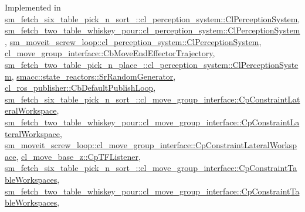 Implemented in \hyperlink{classsm__fetch__six__table__pick__n__sort__1_1_1cl__perception__system_1_1ClPerceptionSystem_a87292907b7b771d19d91c6de47ea8d1d}{sm\+\_\+fetch\+\_\+six\+\_\+table\+\_\+pick\+\_\+n\+\_\+sort\+\_\+::cl\+\_\+perception\+\_\+system\+::\+Cl\+Perception\+System}, \hyperlink{classsm__fetch__two__table__whiskey__pour_1_1cl__perception__system_1_1ClPerceptionSystem_a66a8dfad8b4403b5a0f50fecead09410}{sm\+\_\+fetch\+\_\+two\+\_\+table\+\_\+whiskey\+\_\+pour\+::cl\+\_\+perception\+\_\+system\+::\+Cl\+Perception\+System}, \hyperlink{classsm__moveit__screw__loop_1_1cl__perception__system_1_1ClPerceptionSystem_a171e1bf0334b2eb957792ecb3ad11b7a}{sm\+\_\+moveit\+\_\+screw\+\_\+loop\+::cl\+\_\+perception\+\_\+system\+::\+Cl\+Perception\+System}, \hyperlink{classcl__move__group__interface_1_1CbMoveEndEffectorTrajectory_a57fedb6a0603fe569842a13faf19f5cd}{cl\+\_\+move\+\_\+group\+\_\+interface\+::\+Cb\+Move\+End\+Effector\+Trajectory}, \hyperlink{classsm__fetch__two__table__pick__n__place__1_1_1cl__perception__system_1_1ClPerceptionSystem_ac6e10d6fc38d2b1d561875298307c235}{sm\+\_\+fetch\+\_\+two\+\_\+table\+\_\+pick\+\_\+n\+\_\+place\+\_\+::cl\+\_\+perception\+\_\+system\+::\+Cl\+Perception\+System}, \hyperlink{classsmacc_1_1state__reactors_1_1SrRandomGenerator_adf6e20208210f30639b92214e1dda83b}{smacc\+::state\+\_\+reactors\+::\+Sr\+Random\+Generator}, \hyperlink{classcl__ros__publisher_1_1CbDefaultPublishLoop_aef241d1976f0105643976545880d5e21}{cl\+\_\+ros\+\_\+publisher\+::\+Cb\+Default\+Publish\+Loop}, \hyperlink{classsm__fetch__six__table__pick__n__sort__1_1_1cl__move__group__interface_1_1CpConstraintLateralWorkspace_ac2b93d99ca5fb46aabfa98040124b272}{sm\+\_\+fetch\+\_\+six\+\_\+table\+\_\+pick\+\_\+n\+\_\+sort\+\_\+::cl\+\_\+move\+\_\+group\+\_\+interface\+::\+Cp\+Constraint\+Lateral\+Workspace}, \hyperlink{classsm__fetch__two__table__whiskey__pour_1_1cl__move__group__interface_1_1CpConstraintLateralWorkspace_afbbf07ecc60348ce0f40f6aa0c6fd6f3}{sm\+\_\+fetch\+\_\+two\+\_\+table\+\_\+whiskey\+\_\+pour\+::cl\+\_\+move\+\_\+group\+\_\+interface\+::\+Cp\+Constraint\+Lateral\+Workspace}, \hyperlink{classsm__moveit__screw__loop_1_1cl__move__group__interface_1_1CpConstraintLateralWorkspace_a2c742726dc5d521fba7a357dc4ec3dac}{sm\+\_\+moveit\+\_\+screw\+\_\+loop\+::cl\+\_\+move\+\_\+group\+\_\+interface\+::\+Cp\+Constraint\+Lateral\+Workspace}, \hyperlink{classcl__move__base__z_1_1CpTFListener_a0bdf03c329aab2ea038b67e51996a515}{cl\+\_\+move\+\_\+base\+\_\+z\+::\+Cp\+T\+F\+Listener}, \hyperlink{classsm__fetch__six__table__pick__n__sort__1_1_1cl__move__group__interface_1_1CpConstraintTableWorkspaces_ac938a2faf9dc7e9cc1f24bac150f189f}{sm\+\_\+fetch\+\_\+six\+\_\+table\+\_\+pick\+\_\+n\+\_\+sort\+\_\+::cl\+\_\+move\+\_\+group\+\_\+interface\+::\+Cp\+Constraint\+Table\+Workspaces}, \hyperlink{classsm__fetch__two__table__whiskey__pour_1_1cl__move__group__interface_1_1CpConstraintTableWorkspaces_a7c8e7186aff561f2a1721145814add82}{sm\+\_\+fetch\+\_\+two\+\_\+table\+\_\+whiskey\+\_\+pour\+::cl\+\_\+move\+\_\+group\+\_\+interface\+::\+Cp\+Constraint\+Table\+Workspaces}, 